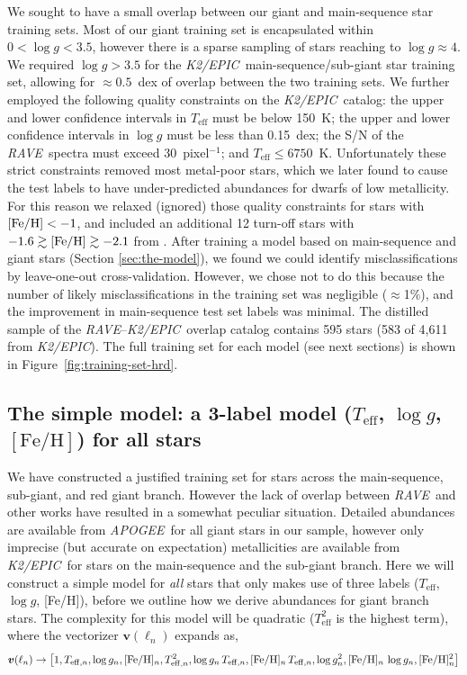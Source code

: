\documentclass[preprint]{aastex}
\newcommand{\acronym}[1]{{\small{#1}}}
\newcommand{\project}[1]{\textsl{#1}}
\newcommand{\rave}{\project{\acronym{RAVE}}}
\newcommand{\apogee}{\project{\acronym{APOGEE}}}
\newcommand{\epic}{\project{K2/EPIC}}
\newcommand{\teff}{T_{\mathrm{eff}}}
\newcommand{\logg}{\log g}
\newcommand{\feh}{[\mathrm{Fe/H}]}
\newcommand{\Dvector}[1]{\boldsymbol{#1}}
\newcommand{\vecv}{\Dvector{v}}
\begin{document}
We sought to have a small overlap between our giant and main-sequence star training
sets.  Most of our giant training set is encapsulated within $0 < \logg < 3.5$, 
however there is a sparse sampling of stars reaching to $\logg \approx 4$.  We
required $\logg > 3.5$ for the \epic\ main-sequence/sub-giant star training set,
allowing for $\approx0.5$~dex of overlap between the two training sets.  We further
employed the following quality constraints on the \epic\ catalog: the upper and lower 
confidence intervals in $\teff$ must be below 150~K; the upper and lower confidence 
intervals in $\logg$ must be less than 0.15~dex; the S/N of the \rave\ spectra must
exceed 30~pixel$^{-1}$; and $\teff \leqslant 6750$~K.  Unfortunately these strict 
constraints removed most metal-poor stars, which we later found to cause the test 
labels to have under-predicted abundances for dwarfs of low metallicity.  For this 
reason we relaxed (ignored) those quality constraints for stars with 
$[{\rm Fe/H}] < -1$, and included an additional 12 turn-off stars with 
$-1.6 \gtrsim [{\rm Fe/H}] \gtrsim -2.1$ from \citet{Ruchti_2011}.  After training
a model based on main-sequence and giant stars (Section \ref{sec:the-model}), we found 
we could identify misclassifications by leave-one-out cross-validation.  However, we 
chose not to do this because the number of likely misclassifications in the training
set was negligible ($\approx$1\%), and the improvement in main-sequence test set labels
was minimal.  The distilled sample of the \rave--\epic\ overlap catalog contains 595 
stars (583 of 4,611 from \epic).  The full training set for each model (see next 
sections) is shown in Figure~\ref{fig:training-set-hrd}.


\subsection{The simple model: a 3-label model ($\teff$, $\logg$, $\feh$) for all stars}
\label{sec:a-simple-model}


We have constructed a justified training set for stars across the main-sequence, sub-giant,
and red giant branch.  However the lack of overlap between \rave\ and other works have
resulted in a somewhat peculiar situation.  Detailed abundances are available from \apogee\
for all giant stars in our sample, however only imprecise (but accurate on expectation)  
metallicities are available from \epic\ for stars on the main-sequence and the sub-giant 
branch.  Here we will construct a simple model for \emph{all} stars that only makes use 
of three labels ($\teff$, $\logg$, [Fe/H]), before we outline how we derive abundances 
for giant branch stars.  The complexity for this model will be quadratic ($\teff^2$
is the highest term), where the vectorizer $\vecv(\ell_n)$ expands as,
\begin{eqnarray}\label{eq:vectorizer-three-label}
\vecv(\ell_n) \rightarrow \left[1, T_{{\rm eff},n}, \logg_n, [{\rm Fe/H}]_n, T_{{\rm eff},n}^2, \logg_n\,T_{{\rm eff},n}, \feh_n\,T_{{\rm eff},n}, \logg_n^2, \feh_n\,\logg_n, \feh_n^2\right]
\end{eqnarray}
\end{document}
